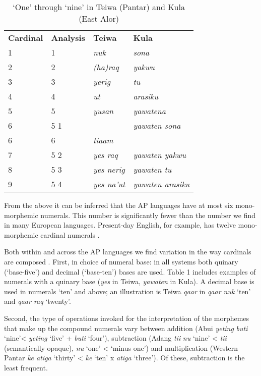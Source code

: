 \begin{table}\centering
\caption{`One' through `nine' in Teiwa (Pantar) and Kula (East Alor)}


\begin{tabular}{llll}

\textbf{Cardinal} & \textbf{Analysis} & \textbf{Teiwa} & \textbf{Kula}\\
1 & 1 & \textit{nuk} & \textit{sona}\\
2 & 2 & \textit{(ha)raq} & \textit{yakwu}\\
3 & 3 & \textit{yerig} & \textit{tu}\\
4 & 4 & \textit{ut} & \textit{arasiku}\\
5 & 5 & \textit{yusan} & \textit{yawatena}\\
6 & 5  1 &  & \textit{yawaten sona}\\
6 & 6 & \textit{tiaam} & \\
7 & 5  2 & \textit{yes raq} & \textit{yawaten yakwu}\\
8 & 5  3 & \textit{yes nerig} & \textit{yawaten tu}\\
9 & 5  4 & \textit{yes na'ut} & \textit{yawaten arasiku}\\
\end{tabular}
\end{table}

From the above it can be inferred that the AP languages have at most six mono-morphemic numerals. This number is significantly fewer than the number we find in many European languages. Present-day English, for example, has twelve mono-morphemic cardinal numerals \citep[26]{VonMengden2010}.

Both within and across the AP languages we find variation in the way cardinals are composed \citep[cf.][]{Stump2010}. First, in choice of numeral base: in all systems both quinary (`base-five') and decimal (`base-ten') bases are used. Table 1 includes examples of numerals with a quinary base (\textit{yes} in Teiwa, \textit{yawaten} in Kula). A decimal base is used in numerals `ten' and above; an illustration is Teiwa \textit{qaar} in \textit{qaar nuk} `ten' and \textit{qaar raq} `twenty'.

Second, the type of operations invoked for the interpretation of the morphemes that make up the compound numerals vary between addition (Abui \textit{yeting} \textit{buti} `nine'{\textless} \textit{yeting} `five' + \textit{buti} `four'), subtraction (Adang  \textit{ti}\textit{{\textglotstop}}\textit{i} \textit{nu} `nine' {\textless} \textit{ti}\textit{{\textglotstop}}\textit{i} (semantically opaque), \textit{nu} `one' {\textless} `minus one') and multiplication (Western Pantar \textit{ke atiga} `thirty' {\textless} \textit{ke} `ten' x \textit{atiga} `three'). Of these, subtraction is the least frequent.

